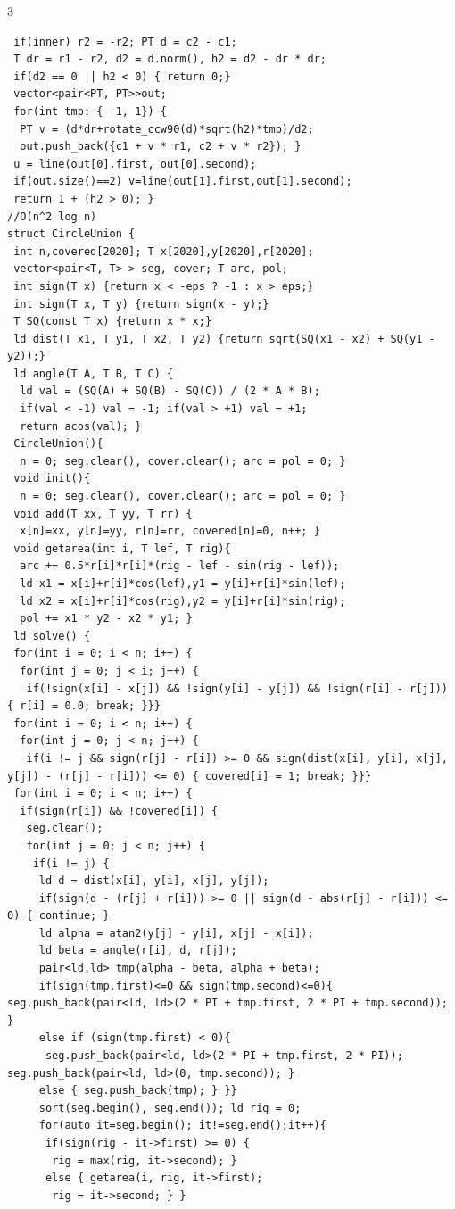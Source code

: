 \documentclass[8pt,a4paper,onesided]{article}
\begin{document}
\begin{multicols}{3}
\begin{verbatim}
 if(inner) r2 = -r2; PT d = c2 - c1;
 T dr = r1 - r2, d2 = d.norm(), h2 = d2 - dr * dr;
 if(d2 == 0 || h2 < 0) { return 0;}
 vector<pair<PT, PT>>out;
 for(int tmp: {- 1, 1}) {
  PT v = (d*dr+rotate_ccw90(d)*sqrt(h2)*tmp)/d2;
  out.push_back({c1 + v * r1, c2 + v * r2}); }
 u = line(out[0].first, out[0].second);
 if(out.size()==2) v=line(out[1].first,out[1].second);
 return 1 + (h2 > 0); }
//O(n^2 log n)
struct CircleUnion {
 int n,covered[2020]; T x[2020],y[2020],r[2020];
 vector<pair<T, T> > seg, cover; T arc, pol;
 int sign(T x) {return x < -eps ? -1 : x > eps;}
 int sign(T x, T y) {return sign(x - y);}
 T SQ(const T x) {return x * x;}
 ld dist(T x1, T y1, T x2, T y2) {return sqrt(SQ(x1 - x2) + SQ(y1 - y2));}
 ld angle(T A, T B, T C) {
  ld val = (SQ(A) + SQ(B) - SQ(C)) / (2 * A * B);
  if(val < -1) val = -1; if(val > +1) val = +1;
  return acos(val); }
 CircleUnion(){
  n = 0; seg.clear(), cover.clear(); arc = pol = 0; }
 void init(){
  n = 0; seg.clear(), cover.clear(); arc = pol = 0; }
 void add(T xx, T yy, T rr) {
  x[n]=xx, y[n]=yy, r[n]=rr, covered[n]=0, n++; }
 void getarea(int i, T lef, T rig){
  arc += 0.5*r[i]*r[i]*(rig - lef - sin(rig - lef));
  ld x1 = x[i]+r[i]*cos(lef),y1 = y[i]+r[i]*sin(lef);
  ld x2 = x[i]+r[i]*cos(rig),y2 = y[i]+r[i]*sin(rig);
  pol += x1 * y2 - x2 * y1; }
 ld solve() {
 for(int i = 0; i < n; i++) {
  for(int j = 0; j < i; j++) {
   if(!sign(x[i] - x[j]) && !sign(y[i] - y[j]) && !sign(r[i] - r[j])) { r[i] = 0.0; break; }}}
 for(int i = 0; i < n; i++) {
  for(int j = 0; j < n; j++) {
   if(i != j && sign(r[j] - r[i]) >= 0 && sign(dist(x[i], y[i], x[j], y[j]) - (r[j] - r[i])) <= 0) { covered[i] = 1; break; }}}
 for(int i = 0; i < n; i++) {
  if(sign(r[i]) && !covered[i]) {
   seg.clear();
   for(int j = 0; j < n; j++) {
    if(i != j) {
     ld d = dist(x[i], y[i], x[j], y[j]);
     if(sign(d - (r[j] + r[i])) >= 0 || sign(d - abs(r[j] - r[i])) <= 0) { continue; }
     ld alpha = atan2(y[j] - y[i], x[j] - x[i]);
     ld beta = angle(r[i], d, r[j]);
     pair<ld,ld> tmp(alpha - beta, alpha + beta);
     if(sign(tmp.first)<=0 && sign(tmp.second)<=0){ seg.push_back(pair<ld, ld>(2 * PI + tmp.first, 2 * PI + tmp.second)); }
     else if (sign(tmp.first) < 0){
      seg.push_back(pair<ld, ld>(2 * PI + tmp.first, 2 * PI)); seg.push_back(pair<ld, ld>(0, tmp.second)); }
     else { seg.push_back(tmp); } }}
     sort(seg.begin(), seg.end()); ld rig = 0;
     for(auto it=seg.begin(); it!=seg.end();it++){
      if(sign(rig - it->first) >= 0) {
       rig = max(rig, it->second); }
      else { getarea(i, rig, it->first);
       rig = it->second; } }

\end{verbatim}
\end{multicols}
\end{document}
